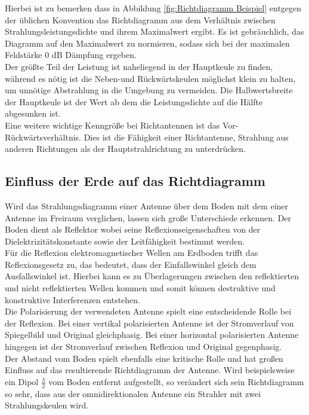 Hierbei ist zu bemerken dass in Abbildung \ref{fig:Richtdiagramm Beispiel} entgegen der üblichen Konvention das Richtdiagramm aus dem Verhältnis zwischen Strahlungsleistungsdichte und ihrem Maximalwert ergibt. Es ist gebräuchlich, das Diagramm auf den Maximalwert zu normieren, sodass sich bei der maximalen Feldstärke 0 dB Dämpfung ergeben.\\
\newline
Der größte Teil der Leistung ist naheliegend in der Hauptkeule zu finden, während es nötig ist die Neben-und Rückwärtskeulen möglichst klein zu halten, um unnötige Abstrahlung in die Umgebung zu vermeiden. Die Halbwertsbreite der Hauptkeule ist der Wert ab dem die Leistungsdichte auf die Hälfte abgesunken ist.\\
\newline
Eine weitere wichtige Kenngröße bei Richtantennen ist das Vor-Rückwärtsverhältnis. Dies ist die Fähigkeit einer Richtantenne, Strahlung aus anderen Richtungen als der Hauptstrahlrichtung zu unterdrücken.

\subsection{Einfluss der Erde auf das Richtdiagramm}
Wird das Strahlungsdiagramm einer Antenne über dem Boden mit dem einer Antenne im Freiraum verglichen, lassen sich große Unterschiede erkennen. Der Boden dient als Reflektor wobei seine Reflexionseigenschaften von der Dielektrizitätskonstante sowie der Leitfähigkeit bestimmt werden.\\
\newline
Für die Reflexion elektromagnetischer Wellen am Erdboden trifft das Reflexionsgesetz zu, das bedeutet, dass der Einfallswinkel gleich dem Ausfallswinkel ist. Hierbei kann es zu Überlagerungen zwischen den reflektierten und nicht reflektierten Wellen kommen und somit können destruktive und konstruktive Interferenzen entstehen.\\
\newline
Die Polarisierung der verwendeten Antenne spielt eine entscheidende Rolle bei der Reflexion. Bei einer vertikal polarisierten Antenne ist der Stromverlauf von Spiegelbild und Original gleichphasig. Bei einer horizontal polarisierten Antenne hingegen ist der Stromverlauf zwischen Reflexion und Original gegenphasig.\\
\newline
Der Abstand vom Boden spielt ebenfalls eine kritische Rolle und hat großen Einfluss auf das resultierende Richtdiagramm der Antenne. Wird beispielsweise ein Dipol $\frac{\lambda}{2}$ vom Boden entfernt aufgestellt, so verändert sich sein Richtdiagramm so sehr, dass aus der omnidirektionalen Antenne ein Strahler mit zwei Strahlungskeulen wird. 


